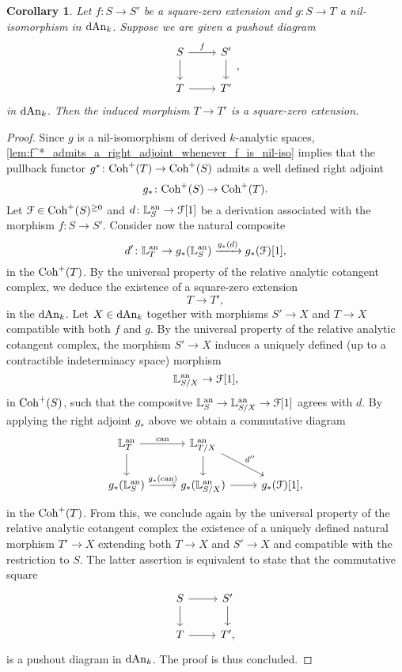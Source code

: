 \documentclass[10pt,a4paper,reqno]{amsart} %
\theoremstyle{plain}
\newtheorem{cor}[thm]{Corollary}
\theoremstyle{definition}
\theoremstyle{remark}
\numberwithin{equation}{section}
\begin{document}
\begin{cor} \label{lem:pushouts_of_square_zero_extensions_have_the_structure_of_a_square_zero_extension}
    Let $f \colon S \to S'$ be a square-zero extension and $g \colon S \to T$ a nil-isomorphism in $\mathrm{dAn}_k$. Suppose we are given a pushout diagram
        \[
        \begin{tikzcd}
            S \ar{r}{f} \ar{d} & S' \ar{d} \\
            T \ar{r} & T'  
        \end{tikzcd},
        \]
    in $\mathrm{dAn}_k$. Then the induced morphism $T \to T'$ is a square-zero extension.
\end{cor}

\begin{proof}
    Since $g$ is a nil-isomorphism of derived $k$-analytic spaces, \cref{lem:f^*_admits_a_right_adjoint_whenever_f_is_nil-iso}
    implies that the pullback functor $g^* \colon \mathrm{Coh}^+(T) \to \mathrm{Coh}^+(S)$ admits a well defined right adjoint
        \[
            g_* \colon \mathrm{Coh}^+(S ) \to \mathrm{Coh}^+(T) .
        \]
    Let $\mathcal F \in \mathrm{Coh}^+(S)^{\ge 0}$ and $d \colon \mathbb L^\mathrm{an}_S \to \mathcal F[1]$ be a derivation
    associated with the morphism $f \colon S \to S'$. Consider now the natural composite
        \[
            d ' \colon \mathbb L^\mathrm{an}_T \to g_* (\mathbb L^\mathrm{an}_S) \xrightarrow{g_*(d)} g_* (\mathcal F)[1],  
        \]
    in the \infcat $\mathrm{Coh}^+(T)$. By the universal property of the relative analytic cotangent complex, we deduce the existence of a square-zero extension
        \[
            T \to T',  
        \]
    in the \infcat $\mathrm{dAn}_k$. Let $X \in \mathrm{dAn}_k$ together with morphisms $S' \to X$ and $T \to X$ compatible with both $f$ and $g$. By the universal property of
    the relative analytic cotangent complex, the morphism $S' \to X$ induces a uniquely defined (up to a contractible indeterminacy space) morphism
        \[
            \mathbb L^\mathrm{an}_{S/X} \to \mathcal F[1],
        \]
    in $\mathrm{Coh}^+(S)$, such that the compositve $\mathbb L^\mathrm{an}_S \to \mathbb L^\mathrm{an}_{S/X} \to \mathcal F[1]$ agrees with $d$. By applying the right adjoint $g_*$ above we obtain a
    commutative diagram
        \[
        \begin{tikzcd}
            \bbL\an_T \ar{r}{\mathrm{can}} \ar{d} & \bbL\an_{T/X} \ar{d} \ar{rd}{d''} & \\
            g_*(\bbL\an_S) \ar{r}{g_*(\mathrm{can})} & g_*(\bbL\an_{S/X}) \ar{r} & g_*(\cF)[1],
        \end{tikzcd}
        \]
    in the \infcat $\mathrm{Coh}^+(T)$. From this, we conclude again by the universal property of the relative analytic cotangent complex the existence
    of a uniquely defined natural morphism $T' \to X$ extending both $T \to X$ and $S' \to X$ and compatible with the restriction to $S$. The latter assertion is equivalent to state
    that the commutative square
        \[
        \begin{tikzcd}
            S \ar{r} \ar{d} & S' \ar{d} \\
            T \ar{r} & T',
        \end{tikzcd}
        \]
    is a pushout diagram in $\mathrm{dAn}_k$. The proof is thus concluded.
\end{proof}
\end{document}
